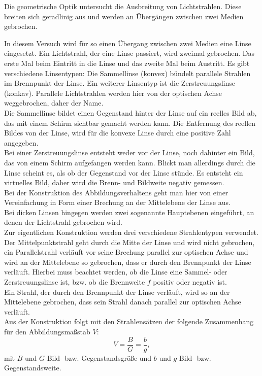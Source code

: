 Die geometrische Optik untersucht die Ausbreitung von Lichtstrahlen. Diese breiten sich geradlinig aus und werden an Übergängen zwischen zwei Medien gebrochen.

In diesem Versuch wird für so einen Übergang zwischen zwei Medien eine Linse eingesetzt. Ein Lichtstrahl, der eine Linse
passiert, wird zweimal gebrochen. Das erste Mal beim Eintritt in
die Linse und das zweite Mal beim Austritt.  Es gibt verschiedene
Linsentypen:  Die Sammellinse (konvex) bündelt parallele Strahlen im Brennpunkt der Linse. Ein weiterer Linsentyp ist die
Zerstreuungslinse (konkav). Parallele Lichtstrahlen werden hier von der optischen Achse weggebrochen, daher der Name.\\

Die Sammellinse bildet einen Gegenstand hinter der Linse auf ein reelles Bild ab, das mit einem Schirm sichtbar gemacht werden kann. Die Entfernung des reellen Bildes von der Linse, wird für die konvexe Linse durch eine positive Zahl angegeben.\\
Bei einer Zerstreuungslinse entsteht weder vor der Linse, noch dahinter ein
Bild, das von einem Schirm aufgefangen werden kann. Blickt man
allerdings durch die Linse scheint es, als ob der Gegenstand vor der
Linse stünde. Es entsteht ein virtuelles Bild, daher wird die Brenn- und Bildweite negativ gemessen.\\

Bei der Konstruktion des Abbildungsverhaltens geht man hier von einer Vereinfachung in Form einer Brechung an der Mittelebene der Linse aus.\\
Bei dicken Linsen hingegen werden zwei sogenannte
Hauptebenen eingeführt, an denen der Lichtstrahl gebrochen wird.\\
Zur eigentlichen Konstruktion werden drei verschiedene Strahlentypen
verwendet. Der Mittelpunktstrahl geht durch die Mitte der Linse und
wird nicht gebrochen, ein Parallelstrahl verläuft vor seine Brechung
parallel zur optischen Achse und wird an der Mittelebene so gebrochen,
dass er durch den Brennpunkt der Linse verläuft. Hierbei muss beachtet
werden, ob die Linse eine Sammel- oder Zerstreuungslinse ist, bzw. ob
die Brennweite $f$ positiv oder negativ ist.\\
Ein Strahl, der durch den Brennpunkt der Linse verläuft, wird so an der Mittelebene gebrochen, dass sein Strahl danach parallel zur optischen Achse verläuft.\\

Aus der Konstruktion folgt mit den Strahlensätzen der folgende
Zusammenhang für den Abbildungsmaßstab $V$:
%
\begin{equation}
  V = \frac{B}{G} = \frac{b}{g},
  \label{eq:Theorie_Abbildungsgesetz}
\end{equation}
%
mit $B$ und $G$ Bild- bzw. Gegenstandsgröße und $b$ und
$g$ Bild- bzw. Gegenstandsweite.\\

